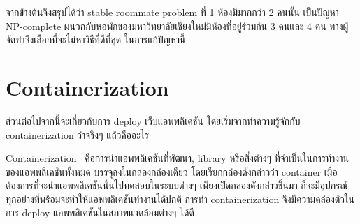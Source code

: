 

จากข้างต้นจึงสรุปได้ว่า stable roommate problem ที่ 1 ห้องมีมากกว่า 2 คนนั้น
เป็นปัญหา NP-complete ผนวกกับหอพักของมหาวิทยาลัยเชียงใหม่มีห้องที่อยู่ร่วมกัน 3 คนและ 4 คน
ทางผู้จัดทำจึงเลือกที่จะไม่หาวิธีที่ดีที่สุด ในการแก้ปัญหานี้

\section{Containerization}
ส่วนต่อไปจากนี้จะเกี่ยวกับการ deploy เว็บแอพพลิเคชัน โดยเริ่มจากทำความรู้จักกับ 
containerization ว่าจริงๆ แล้วคืออะไร

Containerization~\cite{ctnrh} คือการนำแอพพลิเคชันที่พัฒนา, library หรือสิ่งต่างๆ ที่จำเป็นในการทำงานของแอพพลิเคชันทั้งหมด บรรจุลงในกล่องกล่องเดียว โดยเรียกกล่องดังกล่าวว่า container 
เมื่อต้องการที่จะนำแอพพลิเคชันนั้นไปทดสอบในระบบต่างๆ เพียงเปิดกล่องดังกล่าวขึ้นมา
ก็จะมีอุปกรณ์ทุกอย่างที่พร้อมจะทำให้แอพพลิเคชันทำงานได้ปกติ การทำ containerization 
จึงมีความคล่องตัวในการ deploy แอพพลิเคชันในสภาพแวดล้อมต่างๆ ได้ดี 





